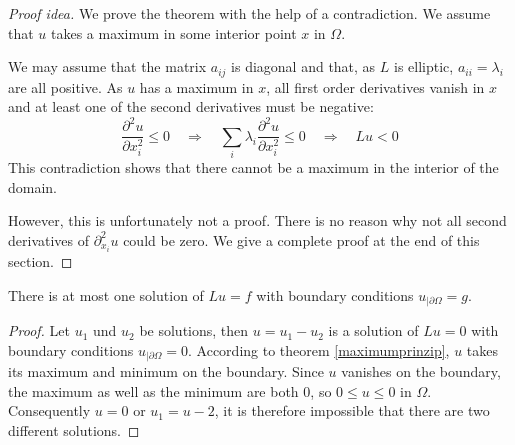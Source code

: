 \begin{proof}[Proof idea]
We prove the theorem with the help of a contradiction.
We assume that $u$ takes a maximum in some interior point $x$
in $\Omega$.

We may assume that the matrix $a_{ij}$ is diagonal and that, as $L$
is elliptic, $a_{ii}=\lambda_i$ are all positive.
As $u$ has a maximum in $x$, all first order derivatives vanish
in $x$ and at least one of the second derivatives
must be negative:
\[
\frac{\partial^2u}{\partial x_i^2}
\le 0
\quad
\Rightarrow
\quad
\sum_{i}\lambda_i \frac{\partial^2u}{\partial x_i^2} \le 0
\quad
\Rightarrow
\quad
Lu<0
\]
This contradiction shows that there cannot be a maximum in the
interior of the domain.

However, this is unfortunately not a proof.
There is no reason why not all second derivatives of $\partial^2_{x_i} u$ 
could be zero.
We give a complete proof at the end of this section.
\end{proof}

\begin{satz}
There is at most one solution of
$Lu=f$ 
with boundary conditions
$u_{|\partial\Omega}=g$.
\end{satz}

\begin{proof}
Let $u_1$ und $u_2$ be solutions, then $u=u_1-u_2$ is a solution of
$Lu=0$ with boundary conditions $u_{|\partial\Omega}=0$.
According to theorem \ref{maximumprinzip}, $u$ takes its maximum and
minimum on the boundary.
Since $u$ vanishes on the boundary, the maximum as well as the minimum
are both $0$, so $0\le u\le 0$ in $\Omega$.
Consequently $u=0$ or $u_1=u-2$, it is therefore impossible that
there are two different solutions.
\end{proof}

